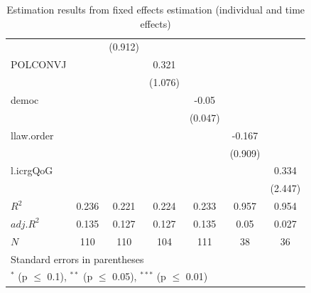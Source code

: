 \documentclass{article}\usepackage{graphicx, color}
\begin{document}
\begin{table}
\begin{tabular}{l*{6}{c}}
  		& 		&(0.912) 		& 		& 		& 		& \\
POLCONVJ 		& 		& 		&0.321 		& 		& 		& \\
  		& 		& 		&(1.076) 		& 		& 		& \\
democ 		& 		& 		& 		&-0.05 		& 		& \\
  		& 		& 		& 		&(0.047) 		& 		& \\
llaw.order 		& 		& 		& 		& 		&-0.167 		& \\
  		& 		& 		& 		& 		&(0.909) 		& \\
l.icrgQoG 		& 		& 		& 		& 		& 		&0.334 \\
  		& 		& 		& 		& 		& 		&(2.447) \\
\hline
$R^2$ 		&0.236 		&0.221 		&0.224 		&0.233 		&0.957 		&0.954 \\
$adj.R^2$ 		&0.135 		&0.127 		&0.127 		&0.135 		&0.05 		&0.027 \\
$N$ 		&\multicolumn{1}{c}{110} 		&\multicolumn{1}{c}{110} 		&\multicolumn{1}{c}{104} 		&\multicolumn{1}{c}{111} 		&\multicolumn{1}{c}{38} 		&\multicolumn{1}{c}{36} \\
\hline\hline
\multicolumn{7}{l}{\footnotesize Standard errors in parentheses}\\
\multicolumn{7}{l}{\footnotesize $^{*}$ (p $\le$ 0.1), $^{**}$ (p $\le$ 0.05), $^{***}$ (p $\le$ 0.01)}\\
\end{tabular}
\caption{Estimation results from fixed effects estimation (individual and time effects)}
\label{tab:fe4}
\end{table}
\def\sym#1{\ifmmode^{#1}\else\(^{#1}\)\fi}
\end{document}
